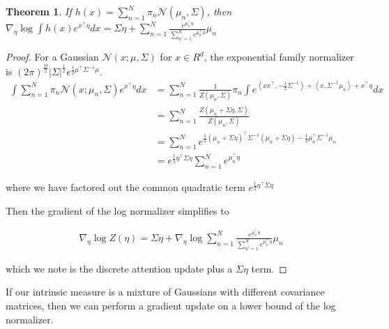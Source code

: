 \documentclass{article}
\newtheorem{theorem}{Theorem}
\begin{document}
\begin{theorem}
  If $h(x) = \sum_{n=1}^N \pi_n \mathcal{N}(\mu_n,\Sigma )$, then $\nabla_\eta \log \int h(x) e^{ x^\intercal \eta } dx = \Sigma \eta + \sum_{n=1}^N \frac{e^{\mu_n^\intercal \eta} }{ \sum_{n'=1}^N e^{ \mu_{n'}^\intercal \eta} } \mu_n$
  \label{rbf update}
\end{theorem}

\begin{proof}
  For a Gaussian $\mathcal{N}(x;\mu,\Sigma)$ for $x \in R^d$, the exponential family normalizer is $(2 \pi)^{\frac{D}{2}} \lvert \Sigma \rvert ^{\frac{1}{2}} e^{\frac{1}{2} \mu^\intercal \Sigma^{-1} \mu }$. \\
  \begin{equation}
    \begin{split}
      \int \sum_{n=1}^N \pi_n \mathcal{N}(x;\mu_n,\Sigma) e^{x^\intercal \eta} dx &= \sum_{n=1}^N \frac{1}{Z(\mu_n,\Sigma)} \pi_n \int e^{ \left< x x^\intercal, - \frac{1}{2} \Sigma^{-1} \right> + \left<x, \Sigma^{-1} \mu_n \right> + x^\intercal \eta} dx \\
      &= \sum_{n=1}^N \frac{Z(\mu_n + \Sigma \eta,\Sigma)}{Z(\mu_n,\Sigma)} \\
      &= \sum_{n=1}^N e^{\frac{1}{2} (\mu_n + \Sigma \eta)^\intercal \Sigma^{-1} (\mu_n + \Sigma \eta) - \frac{1}{2} \mu_n^\intercal \Sigma^{-1} \mu_n} \\
      &= e^{\frac{1}{2} \eta^\intercal \Sigma \eta} \sum_{n=1}^N e^{\mu_n^\intercal \eta}
    \end{split}
    \label{rbf normalizer}
  \end{equation}

  where we have factored out the common quadratic term $e^{\frac{1}{2} \eta^\intercal \Sigma \eta}$

  Then the gradient of the log normalizer simplifies to

  \begin{equation}
    \begin{split}
      \nabla_\eta \log Z(\eta) = \Sigma \eta + \nabla_\eta \log \sum_{n=1}^N \frac{ e^{\mu_n^\intercal \eta} }{ \sum_{n'=1}^N e^{\mu_{n'}^\intercal \eta }} \mu_n
    \end{split}
    \label{rbf update eq}
  \end{equation}

  which we note is the discrete attention update plus a $\Sigma \eta$ term.
\end{proof}

If our intrinsic measure is a mixture of Gaussians with different covariance matrices, then we can perform a gradient update on a lower bound of the log normalizer.
\end{document}
